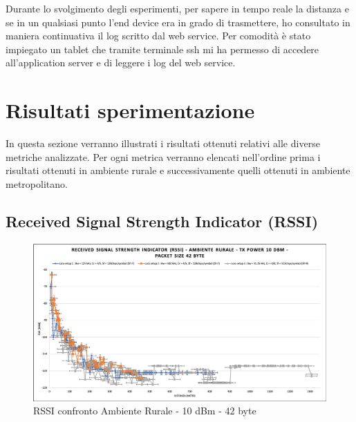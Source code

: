 \documentclass[12pt,a4paper,openright,twoside]{report}
\begin{document}
Durante lo svolgimento degli esperimenti, per sapere in tempo reale la distanza e se in un qualsiasi punto l'end device era in grado di trasmettere, ho consultato in maniera continuativa il log scritto dal web service. Per comodit\`a \`e stato impiegato un tablet che tramite terminale ssh mi ha permesso di accedere all'application server e di leggere i log del web service.

\section{Risultati sperimentazione}
In questa sezione verranno illustrati i risultati ottenuti relativi alle diverse metriche analizzate.
Per ogni metrica verranno elencati nell'ordine prima i risultati ottenuti in ambiente rurale e successivamente quelli ottenuti in ambiente metropolitano.

\subsection{Received Signal Strength Indicator (RSSI)}

\begin{figure}[h]                      
\begin{center} 
\includegraphics[width=\textwidth]{RSSI_confronto_AR-10dBm-42byte.png}
\caption[RSSI confronto Ambiente Rurale - 10 dBm - 42 byte]{RSSI confronto Ambiente Rurale - 10 dBm - 42 byte}\label{fig:prima}
\end{center}
\end{figure}
\end{document}
